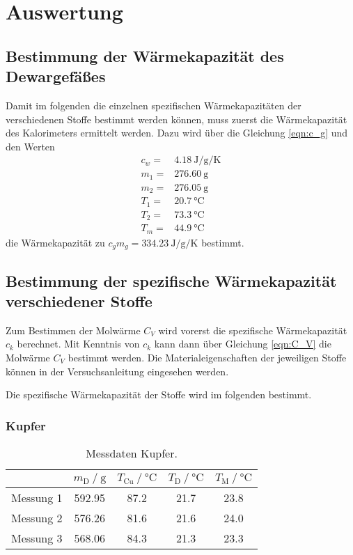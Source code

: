 \section{Auswertung}
\label{sec:Auswertung}


\subsection{Bestimmung der Wärmekapazität des Dewargefäßes}

Damit im folgenden die einzelnen spezifischen Wärmekapazitäten der verschiedenen Stoffe bestimmt werden können, muss zuerst die Wärmekapazität des Kalorimeters ermittelt werden. Dazu wird über die Gleichung \eqref{eqn:c_g} und den Werten
\begin{align*}
    c_w= & \SI{4.18}{\joule\per\g\per\kelvin} \\
    m_1= & \SI{276.60}{\g}         \\
    m_2= & \SI{276.05}{\g}         \\
    T_1= & \SI{20.7}{\celsius}    \\
    T_2= & \SI{73.3}{\celsius}    \\
    T_m= & \SI{44.9}{\celsius}  
\end{align*}
die Wärmekapazität zu $c_gm_g=\SI{334.23}{\joule\per\g\per\kelvin}$ bestimmt.

\subsection{Bestimmung der spezifische Wärmekapazität verschiedener Stoffe}
 
Zum Bestimmen der Molwärme $C_V$ wird vorerst die spezifische Wärmekapazität $c_k$ berechnet. Mit Kenntnis von $c_k$ kann dann über Gleichung \eqref{eqn:C_V} die Molwärme $C_V$ bestimmt werden. Die Materialeigenschaften der jeweiligen Stoffe können in der Versuchsanleitung \cite{V201} eingesehen werden.


Die spezifische Wärmekapazität der Stoffe wird im folgenden bestimmt.

\subsubsection{Kupfer}

\begin{table}
    \centering
    \caption{Messdaten Kupfer.}
    \label{tab:k}
    \begin{tabular}{c| S S S S }
        \toprule
        & $m_\text{D} \:/\: \si{\g}$ & $T_\text{Cu} \:/\: \si{\celsius}$ & $T_\text{D} \:/\: \si{\celsius}$ &  $T_\text{M}\:/\: \si{\celsius}$  \\
        \midrule
        Messung 1 & 592.95 & 87.2 & 21.7 & 23.8 \\
        Messung 2 & 576.26 & 81.6 & 21.6 & 24.0 \\
        Messung 3 & 568.06 & 84.3 & 21.3 & 23.3 \\
        \bottomrule 
    \end{tabular}
\end{table}

